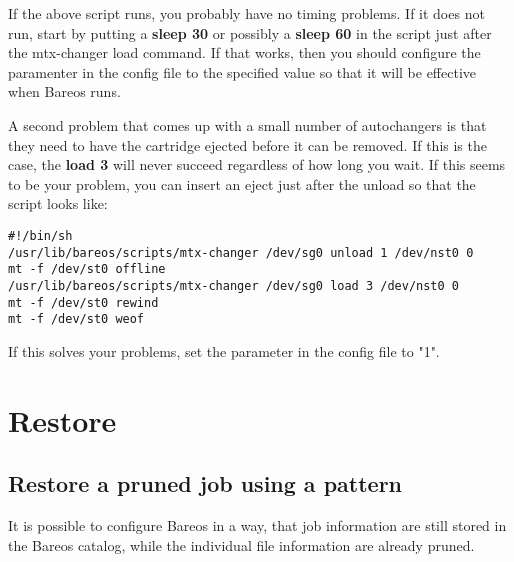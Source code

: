 If the above script runs, you probably have no timing problems. If it does not
run, start by putting a {\bf sleep 30} or possibly a {\bf sleep 60} in the
script just after the mtx-changer load command. If that works, then you should
configure the  paramenter in the config file  to the specified value  so that it will be
effective when Bareos runs.

A second problem that comes up with a small number of autochangers is that
they need to have the cartridge ejected before it can be removed. If this is
the case, the {\bf load 3} will never succeed regardless of how long you wait.
If this seems to be your problem, you can insert an eject just after the
unload so that the script looks like:

\footnotesize
\begin{verbatim}
#!/bin/sh
/usr/lib/bareos/scripts/mtx-changer /dev/sg0 unload 1 /dev/nst0 0
mt -f /dev/st0 offline
/usr/lib/bareos/scripts/mtx-changer /dev/sg0 load 3 /dev/nst0 0
mt -f /dev/st0 rewind
mt -f /dev/st0 weof
\end{verbatim}
\normalsize

If this solves your problems, set the parameter  in the config file  to "1".





\section{Restore}

\subsection{Restore a pruned job using a pattern}

  It is possible to configure Bareos in a way,
  that job information are still stored in the Bareos catalog,
  while the individual file information are already pruned.

